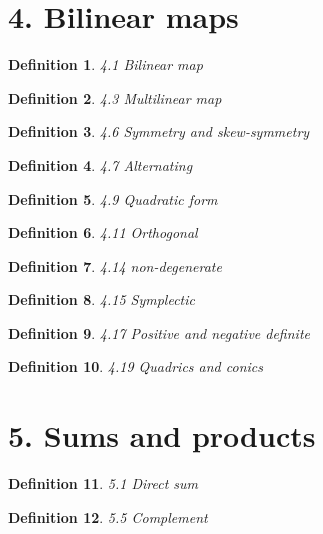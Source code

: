 \documentclass[12pt]{article}
\theoremstyle{plain}
\newtheorem{definition}{Definition}
\begin{document}
\section{4. Bilinear maps}

\begin{definition} 
  4.1 Bilinear map
\end{definition}


\begin{definition} 
 4.3 Multilinear map 
\end{definition}


\begin{definition} 
 4.6 Symmetry and skew-symmetry 
\end{definition}



\begin{definition} 
 4.7 Alternating 
\end{definition}


\begin{definition} 
 4.9 Quadratic form 
\end{definition}


\begin{definition} 
 4.11 Orthogonal 
\end{definition}


\begin{definition} 
 4.14 non-degenerate 
\end{definition}


\begin{definition} 
 4.15 Symplectic    
\end{definition}


\begin{definition} 
 4.17 Positive and negative definite 
\end{definition}


\begin{definition} 
 4.19 Quadrics and conics 
\end{definition}


\section{5. Sums and products}

\begin{definition} 
  5.1 Direct sum
\end{definition}



\begin{definition} 
 5.5 Complement 
\end{definition}
\end{document}
